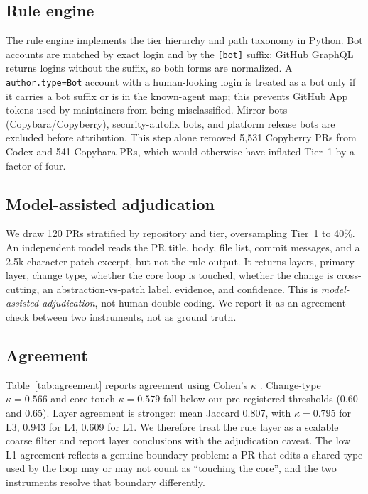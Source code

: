 \documentclass[sigconf,review]{acmart}
\begin{document}
\subsection{Rule engine}

The rule engine implements the tier hierarchy and path taxonomy in Python. Bot accounts are matched by exact login and by the \texttt{[bot]} suffix; GitHub GraphQL returns logins without the suffix, so both forms are normalized. A \texttt{author.type=Bot} account with a human-looking login is treated as a bot only if it carries a bot suffix or is in the known-agent map; this prevents GitHub App tokens used by maintainers from being misclassified. Mirror bots (Copybara/Copyberry), security-autofix bots, and platform release bots are excluded before attribution. This step alone removed 5,531 Copyberry PRs from Codex and 541 Copybara PRs, which would otherwise have inflated Tier~1 by a factor of four.

\subsection{Model-assisted adjudication}

We draw 120 PRs stratified by repository and tier, oversampling Tier~1 to 40\%. An independent model reads the PR title, body, file list, commit messages, and a 2.5k-character patch excerpt, but not the rule output. It returns layers, primary layer, change type, whether the core loop is touched, whether the change is cross-cutting, an abstraction-vs-patch label, evidence, and confidence. This is \emph{model-assisted adjudication}, not human double-coding. We report it as an agreement check between two instruments, not as ground truth.

\subsection{Agreement}

Table~\ref{tab:agreement} reports agreement using Cohen's $\kappa$ \citep{cohen1960}. Change-type $\kappa=0.566$ and core-touch $\kappa=0.579$ fall below our pre-registered thresholds (0.60 and 0.65). Layer agreement is stronger: mean Jaccard 0.807, with $\kappa=0.795$ for L3, 0.943 for L4, 0.609 for L1. We therefore treat the rule layer as a scalable coarse filter and report layer conclusions with the adjudication caveat. The low L1 agreement reflects a genuine boundary problem: a PR that edits a shared type used by the loop may or may not count as ``touching the core'', and the two instruments resolve that boundary differently.
\end{document}
